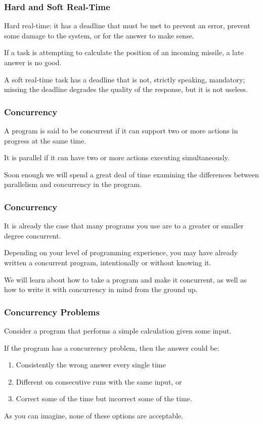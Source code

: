\begin{frame}
\frametitle{Hard and Soft Real-Time}

\alert{Hard real-time}: it has a deadline that must be met to prevent an error, prevent some damage to the system, or for the answer to make sense. 

If a task is attempting to calculate the position of an incoming missile, a late answer is no good. 

A \alert{soft real-time} task has a deadline that is not, strictly speaking, mandatory; missing the deadline degrades the quality of the response, but it is not useless.


\end{frame}


\begin{frame}
	\frametitle{Concurrency}
	A program is said to be concurrent if it can support two or more actions in progress at the same time.

	It is parallel if it can have two or more actions executing simultaneously.

	Soon enough we will spend a great deal of time examining the differences between parallelism and concurrency in the program.

\end{frame}

\begin{frame}
	\frametitle{Concurrency}

	It is already the case that many programs you use are to a greater or smaller degree concurrent.

	Depending on your level of programming experience, you may have already written a concurrent program, intentionally or without knowing it.

	We will learn about how to take a program and make it concurrent, as well as how to write it with concurrency in mind from the ground up.

\end{frame}


\begin{frame}
	\frametitle{Concurrency Problems}

	Consider a program that performs a simple calculation given some input.

	If the program has a concurrency problem,  then the answer could be:

	\begin{enumerate}
		\item Consistently the wrong answer every single time
		\item Different on consecutive runs with the same input, or
		\item Correct some of the time but incorrect some of the time.
	\end{enumerate}

	As you can imagine, none of these options are acceptable.

\end{frame}


